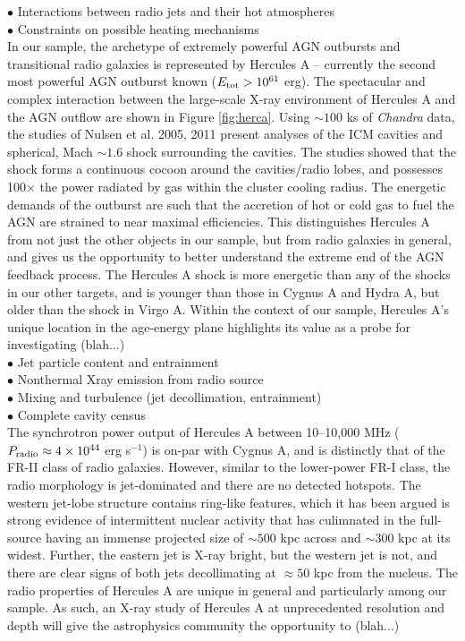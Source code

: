 \documentclass[12pt,letterpaper]{article}
\begin{document}
\noindent$\bullet$ Interactions between radio jets and their hot atmospheres\\
\noindent$\bullet$ Constraints on possible heating mechanisms\\

In our sample, the archetype of extremely powerful AGN outbursts and
transitional radio galaxies is represented by Hercules A -- currently
the second most powerful AGN outburst known ($E_{\rm{tot}} > 10^{61}$
erg). The spectacular and complex interaction between the large-scale
X-ray environment of Hercules A and the AGN outflow are shown in
Figure \ref{fig:herca}. Using $\sim 100$ ks of {\it{Chandra}} data,
the studies of Nulsen et al. 2005, 2011 present analyses of the ICM
cavities and spherical, Mach $\sim 1.6$ shock surrounding the
cavities. The studies showed that the shock forms a continuous cocoon
around the cavities/radio lobes, and possesses 100$\times$ the power
radiated by gas within the cluster cooling radius. The energetic
demands of the outburst are such that the accretion of hot or cold gas
to fuel the AGN are strained to near maximal efficiencies. This
distinguishes Hercules A from not just the other objects in our
sample, but from radio galaxies in general, and gives us the
opportunity to better understand the extreme end of the AGN feedback
process. The Hercules A shock is more energetic than any of the shocks
in our other targets, and is younger than those in Cygnus A and Hydra
A, but older than the shock in Virgo A. Within the context of our
sample, Hercules A's unique location in the age-energy plane
highlights its value as a probe for investigating (blah...)\\

\noindent$\bullet$ Jet particle content and entrainment\\
\noindent$\bullet$ Nonthermal Xray emission from radio source\\
\noindent$\bullet$ Mixing and turbulence (jet decollimation, entrainment)\\
\noindent$\bullet$ Complete cavity census\\

The synchrotron power output of Hercules A between 10--10,000 MHz
($P_{\rm{radio}} \approx 4 \times 10^{44}$ erg s$^{-1}$) is on-par
with Cygnus A, and is distinctly that of the FR-II class of radio
galaxies. However, similar to the lower-power FR-I class, the radio
morphology is jet-dominated and there are no detected hotspots. The
western jet-lobe structure contains ring-like features, which it has
been argued is strong evidence of intermittent nuclear activity that
has culimnated in the full-source having an immense projected size of
$\sim 500$ kpc across and $\sim 300$ kpc at its widest. Further, the
eastern jet is X-ray bright, but the western jet is not, and there are
clear signs of both jets decollimating at $\approx 50$ kpc from the
nucleus. The radio properties of Hercules A are unique in general and
particularly among our sample. As such, an X-ray study of Hercules A
at unprecedented resolution and depth will give the astrophysics
community the opportunity to (blah...)\\
\end{document}
